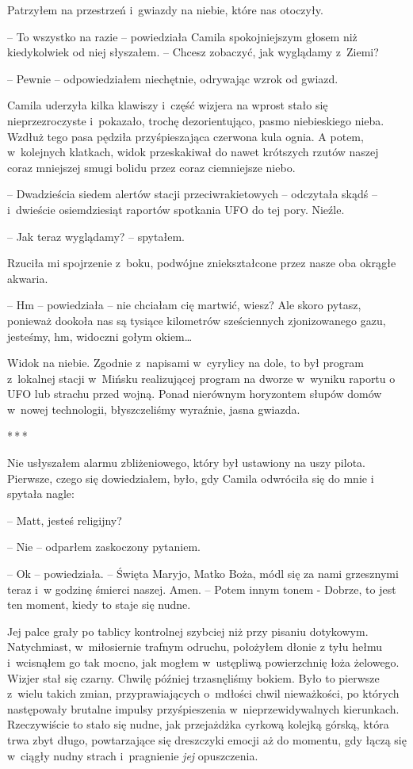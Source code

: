 \documentclass[oneside,polish,12pt,sfheadings]{mwbk}
\newcommand{\threeast}{\bigskip\par\centerline{*\,*\,*}\medskip\par}%
\begin{document}
Patrzyłem na przestrzeń i~gwiazdy na niebie, które nas otoczyły.

-- To wszystko na razie -- powiedziała Camila spokojniejszym głosem niż
kiedykolwiek od niej słyszałem. -- Chcesz zobaczyć, jak wyglądamy z~Ziemi?

-- Pewnie -- odpowiedziałem niechętnie, odrywając wzrok od gwiazd.

Camila uderzyła kilka klawiszy i~część wizjera na wprost stało się
nieprzezroczyste i~pokazało, trochę dezorientująco, pasmo niebieskiego
nieba. Wzdłuż tego pasa pędziła przyśpieszająca czerwona kula ognia. A
potem, w~kolejnych klatkach, widok przeskakiwał do nawet krótszych
rzutów naszej coraz mniejszej smugi bolidu przez coraz ciemniejsze
niebo.

-- Dwadzieścia siedem alertów stacji przeciwrakietowych -- odczytała skądś
-- i~dwieście osiemdziesiąt raportów spotkania UFO do tej pory. Nieźle.

-- Jak teraz wyglądamy? -- spytałem.

Rzuciła mi spojrzenie z~boku, podwójne zniekształcone przez nasze oba
okrągłe akwaria. 

-- Hm -- powiedziała -- nie chciałam cię martwić, wiesz?
Ale skoro pytasz, ponieważ dookoła nas są tysiące kilometrów
sześciennych zjonizowanego gazu, jesteśmy, hm, widoczni gołym okiem\ldots

Widok na niebie. Zgodnie z~napisami w~cyrylicy na dole, to był program z~lokalnej stacji w~Mińsku realizującej program na dworze w~wyniku raportu
o UFO lub strachu przed wojną. Ponad nierównym horyzontem słupów domów w~nowej technologii, błyszczeliśmy wyraźnie, jasna gwiazda.

\threeast

Nie usłyszałem alarmu zbliżeniowego, który był ustawiony na uszy pilota.
Pierwsze, czego się dowiedziałem, było, gdy Camila odwróciła się do mnie
i spytała nagle: 

-- Matt, jesteś religijny?

-- Nie -- odparłem zaskoczony pytaniem.

-- Ok -- powiedziała. -- Święta Maryjo, Matko Boża, módl się za nami
grzesznymi teraz i~w godzinę śmierci naszej. Amen. -- Potem innym tonem -
Dobrze, to jest ten moment, kiedy to staje się nudne.

Jej palce grały po tablicy kontrolnej szybciej niż przy pisaniu
dotykowym. Natychmiast, w~miłosiernie trafnym odruchu, położyłem dłonie
z tyłu hełmu i~wcisnąłem go tak mocno, jak mogłem w~ustępliwą
powierzchnię łoża żelowego. Wizjer stał się czarny. Chwilę później
trzasnęliśmy bokiem. Było to pierwsze z~wielu takich zmian,
przyprawiających o~mdłości chwil nieważkości, po których następowały
brutalne impulsy przyśpieszenia w~nieprzewidywalnych kierunkach.
Rzeczywiście to stało się nudne, jak przejażdżka cyrkową kolejką górską,
która trwa zbyt długo, powtarzające się dreszczyki emocji aż do momentu,
gdy łączą się w~ciągły nudny strach i~pragnienie \emph{jej} opuszczenia.
\end{document}

